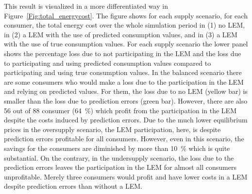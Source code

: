 This result is visualized in a more differentiated way in Figure~\ref{Fig:total_energycost}. The figure shows for each supply scenario, for each consumer, the total energy cost over the whole simulation period in (1) no LEM, in (2) a LEM with the use of predicted consumption values, and in (3) a LEM with the use of true consumption values. For each supply scenario the lower panel shows the percentage loss due to not participating in the LEM and the loss due to participating and using predicted consumption values compared to participating and using true consumption values. In the balanced scenario there are some consumers who would make a loss due to the participation in the LEM and relying on predicted values. For them, the loss due to no LEM (yellow bar) is smaller than the loss due to prediction errors (green bar). However, there are also 56 out of 88 consumer (64~\%) which profit from the participation in the LEM despite the costs induced by prediction errors. Due to the much lower equilibrium prices in the oversupply scenario, the LEM participation, here, is despite prediction errors profitable for all consumers. However, even in this scenario, the savings for the consumers are diminished by more than 10~\% which is quite substantial. On the contrary, in the undersupply scenario, the loss due to the prediction errors leaves the participation in the LEM for almost all consumers unprofitable. Merely three consumers would profit and have lower costs in a LEM despite prediction errors than without a LEM.


